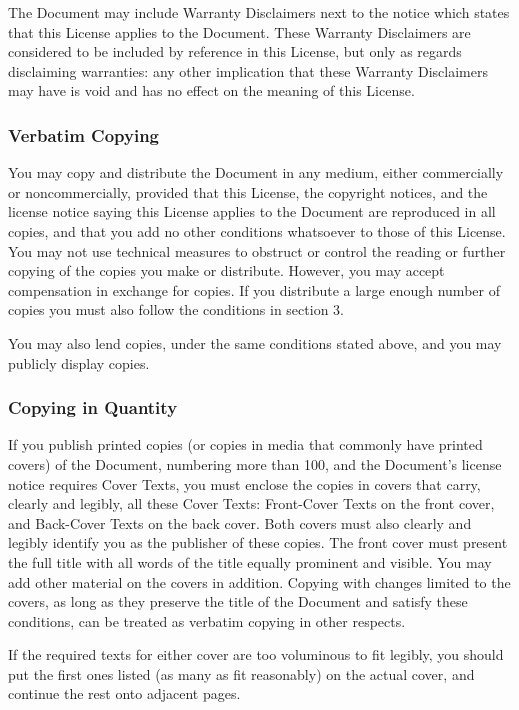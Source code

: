 \documentclass{article}
\begin{document}
The Document may include Warranty Disclaimers next to the notice which
states that this License applies to the Document.  These Warranty
Disclaimers are considered to be included by reference in this
License, but only as regards disclaiming warranties: any other
implication that these Warranty Disclaimers may have is void and has
no effect on the meaning of this License.

\subsubsection{Verbatim Copying}

You may copy and distribute the Document in any medium, either
commercially or noncommercially, provided that this License, the
copyright notices, and the license notice saying this License applies
to the Document are reproduced in all copies, and that you add no other
conditions whatsoever to those of this License.  You may not use
technical measures to obstruct or control the reading or further
copying of the copies you make or distribute.  However, you may accept
compensation in exchange for copies.  If you distribute a large enough
number of copies you must also follow the conditions in section 3.

You may also lend copies, under the same conditions stated above, and
you may publicly display copies.

\subsubsection{Copying in Quantity}

If you publish printed copies (or copies in media that commonly have
printed covers) of the Document, numbering more than 100, and the
Document's license notice requires Cover Texts, you must enclose the
copies in covers that carry, clearly and legibly, all these Cover
Texts: Front-Cover Texts on the front cover, and Back-Cover Texts on
the back cover.  Both covers must also clearly and legibly identify
you as the publisher of these copies.  The front cover must present
the full title with all words of the title equally prominent and
visible.  You may add other material on the covers in addition.
Copying with changes limited to the covers, as long as they preserve
the title of the Document and satisfy these conditions, can be treated
as verbatim copying in other respects.

If the required texts for either cover are too voluminous to fit
legibly, you should put the first ones listed (as many as fit
reasonably) on the actual cover, and continue the rest onto adjacent
pages.
\end{document}
